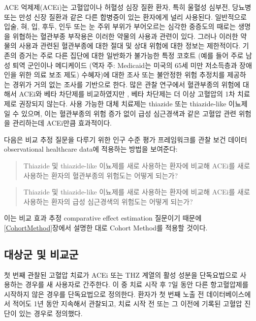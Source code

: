 \documentclass[10.5pt]{book}
\theoremstyle{definition}
\theoremstyle{definition}
\theoremstyle{definition}
\theoremstyle{remark}
\begin{document}
ACE 억제제(ACEi)는 고혈압이나 허혈성 심장 질환 환자, 특히 울혈성 심부전,
당뇨병 또는 만성 신장 질환과 같은 다른 합병증이 있는 환자에게 널리
사용된다. \citep{zaman_2002} 일반적으로 입술, 혀, 입, 후두, 인두 또는 눈
주위 부위가 부어오르는 심각한 중증도의 때로는 생명을 위협하는 혈관부종
부작용은 이러한 약물의 사용과 관련이 있다. \citep{sabroe_1997} 그러나
이러한 약물의 사용과 관련된 혈관부종에 대한 절대 및 상대 위험에 대한
정보는 제한적이다. 기존의 증거는 주로 다른 집단에 대한 일반화가 불가능한
특정 코호트 (예를 들어 주로 남성 퇴역 군인이나 메디케이드 (역자 주:
Medicaid는 미국의 65세 미만 저소득층과 장애인을 위한 의료 보조 제도)
수혜자)에 대한 조사 또는 불안정한 위험 추정치를 제공하는 경위가 거의
없는 조사를 기반으로 한다. \citep{powers_2012} 많은 관찰 연구에서
혈관부종의 위험에 대해서 ACEi와 베타 차단제를 비교하였지만
\citep{magid_2010, toh_2012}, 베타 차단제는 더 이상 고혈압의 1차
치료제로 권장되지 않는다. \citep{whelton_2018} 사용 가능한 대체 치료제는
thiazide 또는 thiazide-like 이뇨제일 수 있으며, 이는 혈관부종의 위험
증가 없이 급성 심근경색과 같은 고혈압 관련 위험을 관리하는데 ACEi만큼
효과적이다.

다음은 비교 추정 질문을 다루기 위한 인구 수준 평가 프레임워크를 관찰
보건 데이터 observational healthcare data에 적용하는 방법을 보여준다:

\begin{quote}
Thiazide 및 thiazide-like 이뇨제를 새로 사용하는 환자에 비교해 ACEi를
새로 사용하는 환자의 혈관부종의 위험도는 어떻게 되는가?
\end{quote}

\begin{quote}
Thiazide 및 thiazide-like 이뇨제를 새로 사용하는 환자에 비교해 ACEi를
새로 사용하는 환자의 급성 심근경색의 위험도는 어떻게 되는가?
\end{quote}

이는 비교 효과 추정 comparative effect estimation 질문이기 때문에
\ref{CohortMethod}장에서 설명한 대로 Cohort Method를 적용할 것이다.

\subsection{대상군 및 비교군}\label{--}

첫 번째 관찰된 고혈압 치료가 ACEi 또는 THZ 계열의 활성 성분을
단독요법으로 사용하는 경우를 새 사용자로 간주한다. 이 중 치료 시작 후
7일 동안 다른 항고혈압제를 시작하지 않은 경우를 단독요법으로 정의한다.
환자가 첫 번째 노출 전 데이터베이스에서 적어도 1년 동안 지속해서
관찰되고, 치료 시작 전 또는 그 이전에 기록된 고혈압 진단이 있는 경우로
정의했다.
\end{document}

